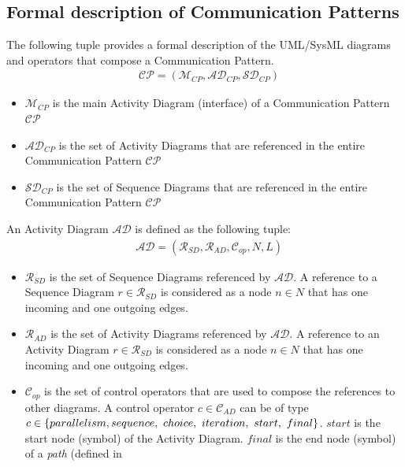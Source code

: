 \documentclass{llncs}
\begin{document}
\newpage
\begin{subappendices}
%
\section{Formal description of Communication Patterns}
\label{app:FormalCP}
%
The following tuple provides a formal description of the UML/SysML diagrams and operators that compose a Communication
Pattern.
%
\begin{align*}
&\mathcal{CP} = ( \mathcal{M}_{CP}, \mathcal{AD}_{CP}, \mathcal{SD}_{CP} )
\end{align*}
%
%
\begin{itemize}
	\item $\mathcal{M}_{CP}$ is the main Activity Diagram (interface) of a Communication Pattern $\mathcal{CP}$
	\item $\mathcal{AD}_{CP}$ is the set of Activity Diagrams that are referenced in the entire Communication Pattern
	$\mathcal{CP}$
	\item $\mathcal{SD}_{CP}$ is the set of Sequence Diagrams that are referenced in the entire Communication Pattern
	$\mathcal{CP}$
%
\end{itemize}
%
An Activity Diagram $\mathcal{AD}$ is defined as the following tuple:
%
\begin{align*}
&\mathcal{AD} = ( \mathcal{R}_{SD}, \mathcal{R}_{AD}, \mathcal{C}_{op}, N, L )
\end{align*}
%
%
\begin{itemize}
	\item $\mathcal{R}_{SD}$ is the set of Sequence Diagrams referenced by $\mathcal{AD}$. A reference to a Sequence Diagram $r \in
	\mathcal{R}_{SD}$ is considered as a node $n \in N$ that has one incoming and one outgoing edges.
	\item $\mathcal{R}_{AD}$ is the set of Activity Diagrams referenced by $\mathcal{AD}$. A reference to an Activity Diagram $r \in
	\mathcal{R}_{SD}$ is considered as a node $n \in N$ that has one incoming and one outgoing edges.
	\item $\mathcal{C}_{op}$ is the set of control operators that are used to compose the references to other diagrams. A control
	operator $c \in \mathcal{C}_{AD}$ can be of type $c \in \{parallelism,\\sequence,\ choice,\ iteration,\ start,\ final\}$.
	$start$ is the start node (symbol) of the Activity Diagram. $final$ is the end node (symbol) of a \textit{path} (defined in

\end{itemize}
\end{subappendices}
\end{document}
